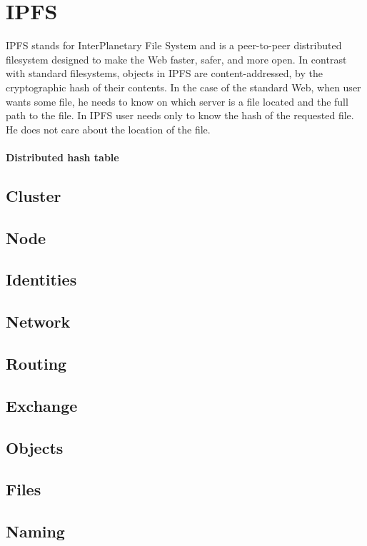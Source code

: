 \chapter{IPFS}

IPFS stands for InterPlanetary File System and is a peer-to-peer distributed filesystem designed to make the Web faster, safer, and more open. In contrast with standard filesystems, objects in IPFS are content-addressed, by the cryptographic hash of their contents. In the case of the standard Web, when user wants some file, he needs to know on which server is a file located and the full path to the file. In IPFS user needs only to know the hash of the requested file. He does not care about the location of the file.

\subsubsection{Distributed hash table} 

\section{Cluster}

\section{Node}



\section{Identities}  
\section{Network}  
\section{Routing} 
\section{Exchange} 
\section{Objects}  
\section{Files}  
\section{Naming}  
